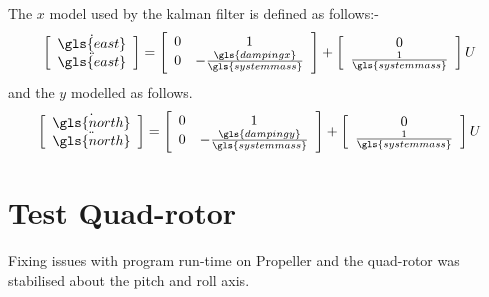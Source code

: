 	The $x$ model used by the kalman filter is defined as follows:-
						\begin{equation}
					\left[\begin{array}{c}
					\dot{\gls{east}}                          \\ 
					\ddot{\gls{east}}                                                          
					\end{array} \right] = 		
						\left[\begin{array}{cc}
					0       &                 1                         \\ 
						0                                                          &-\frac{ \gls{dampingx} }{\gls{systemmass}}        
						\end{array} \right]
				+
											\left[\begin{array}{c}
									      	0                         \\ 
											\frac{ 1 }{\gls{systemmass}}                                                       
											\end{array} \right] U					
						\end{equation}
and the $y$ modelled as follows.						
						\begin{equation}
						\left[\begin{array}{c}
						\dot{\gls{north}}                          \\ 
						\ddot{\gls{north}}                                                          
						\end{array} \right] = 		
						\left[\begin{array}{cc}
						0       &                 1                         \\ 
						0                                                          &-\frac{ \gls{dampingy} }{\gls{systemmass}}        
						\end{array} \right]
						+
						\left[\begin{array}{c}
						0                         \\ 
						\frac{ 1 }{\gls{systemmass}}                                                       
						\end{array} \right] U					
						\end{equation}
	
 \tocless\section{Test Quad-rotor}
Fixing issues with program run-time on Propeller and the quad-rotor was stabilised about the pitch and roll axis.						